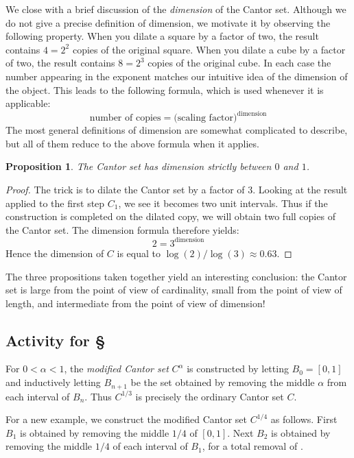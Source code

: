 \documentclass[11pt,oneside]{amsbook}
\theoremstyle{definition}
\theoremstyle{plain}
\newtheorem{proposition}[theorem]{Proposition}
\theoremstyle{definition}
\theoremstyle{remark}
\numberwithin{equation}{section}
\numberwithin{figure}{section}
\begin{document}
We close with a brief discussion of the \emph{dimension} of the Cantor set. Although we do not give a precise definition of dimension, we motivate it by observing the following property. When you dilate a square by a factor of two, the result contains $4=2^2$ copies of the original square. When you dilate a cube by a factor of two, the result contains $8=2^3$ copies of the original cube. In each case the number appearing in the exponent matches our intuitive idea of the dimension of the object. This leads to the following formula, which is used whenever it is applicable:
\[\text{number of copies}=\text{(scaling factor)}^\text{dimension}
\]
The most general definitions of dimension are somewhat complicated to describe, but all of them reduce to the above formula when it applies.

\begin{proposition}
  The Cantor set has dimension strictly between $0$ and $1$.
\end{proposition}

\begin{proof}
  The trick is to dilate the Cantor set by a factor of $3$. Looking at the result applied to the first step $C_1$, we see it becomes two unit intervals. Thus if the construction is completed on the dilated copy, we will obtain two full copies of the Cantor set. The dimension formula therefore yields:
\[2=3^{\text{dimension}}
\]
Hence the dimension of $C$ is equal to $\log(2)/\log(3)\approx0.63$.
\end{proof}

The three propositions taken together yield an interesting conclusion: the Cantor set is large from the point of view of cardinality, small from the point of view of length, and intermediate from the point of view of dimension!

\newpage
\subsection*{Activity for \S \thesection}

For $0<\alpha<1$, the \emph{modified Cantor set} $C^\alpha$ is constructed by letting $B_0=[0,1]$ and inductively letting $B_{n+1}$ be the set obtained by removing the middle $\alpha$ from each interval of $B_n$. Thus $C^{1/3}$ is precisely the ordinary Cantor set $C$.

For a new example, we construct the modified Cantor set $C^{1/4}$ as follows. First $B_1$ is obtained by removing the middle $1/4$ of $[0,1]$. Next $B_2$ is obtained by removing the middle $1/4$ of each interval of $B_1$, for a total removal of \underline{\hspace{1in}}.
\end{document}
